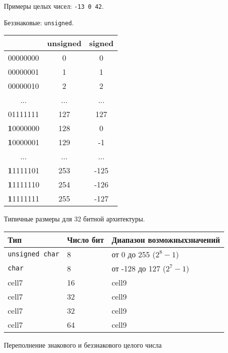 \documentclass[myc.tex]{subfiles}
\begin{document}

Примеры целых чисел: \texttt{-13 0 42}.





Беззнаковые: \texttt{unsigned}.

\begin{small}
\begin{center}
\begin{tabular}{|c|c|c|}
\hline
 & \textbf{unsigned} & \textbf{signed}\\
\hline
00000000 & 0 & 0\\
00000001 & 1 & 1\\
00000010 & 2 & 2\\
... & ... & ...\\
01111111 & 127 & 127\\
\textbf{1}0000000 & 128 & 0\\
\textbf{1}0000001 & 129 & -1\\
... & ... & ...\\
\textbf{1}1111101 & 253 & -125\\
\textbf{1}1111110 & 254 & -126\\
\textbf{1}1111111 & 255 & -127\\%
\hline
\end{tabular}
\end{center}
\end{small}

Типичные размеры для 32 битной архитектуры.

\noindent
\begin{small}
\begin{tabularx}{\textwidth}{|l|l|X|}
\hline
\textbf{Тип} & \textbf{Число бит} & \textbf{Диапазон возможных\newline значений}\\
\hline
\texttt{unsigned char} & 8 & от 0 до 255 ($2^8-1$)\\ 
\texttt{char} & 8 & от -128 до 127 ($2^7-1$)\\ %
\hline
cell7 & 16 & cell9 \\ 
cell7 & 32 & cell9 \\ 
cell7 & 32 & cell9 \\ 
cell7 & 64 & cell9 \\ 
\hline
\end{tabularx}
\end{small}


Переполнение знакового и беззнакового целого числа
\end{document}
